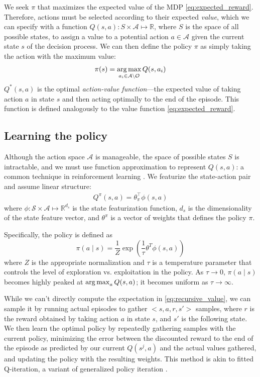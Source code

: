 We seek $\pi$ that maximizes the expected value of the MDP \eqref{eq:expected_reward}.
Therefore, actions must be selected according to their expected \emph{value}, which we can specify with a function $Q(s,a): S \times \mathcal{A} \mapsto \mathbb{R}$, where $S$ is the space of all possible states, to assign a value to a potential action $a \in \mathcal{A}$ given the current state $s$ of the decision process.
We can then define the policy $\pi$ as simply taking the action with the maximum value:
\begin{align}
\pi(s) = \operatorname*{arg\,max}_{a_i \in \mathcal{A} \setminus \mathcal{O}} Q(s,a_i)
\end{align}
$Q^*(s,a)$ is the optimal \emph{action-value function}---the expected value of taking action $a$ in state $s$ and then acting optimally to the end of the episode.
This function is defined analogously to the value function \eqref{eq:expected_reward}.

\subsection{Learning the policy}
Although the action space $\mathcal{A}$ is manageable, the space of possible states $S$ is intractable, and we must use function approximation to represent $Q(s,a)$: a common technique in reinforcement learning \cite{Sutton1998}.
We featurize the state-action pair and assume linear structure:
\begin{align}
Q^\pi(s,a) = \theta_\pi^\top \phi(s,a)
\end{align}
where $\phi: \mathcal{S} \times \mathcal{A} \mapsto \mathbb{R}^{d_s}$ is the state featurization function, $d_s$ is the dimensionality of the state feature vector, and $\theta^\pi$ is a vector of weights that defines the policy $\pi$.

Specifically, the policy is defined as
\begin{equation}
\pi(a \mid s) = \frac{1}{Z} \exp\left(\frac{1}{\tau} \theta^T \phi(s, a)\right)
\end{equation}
where $Z$ is the appropriate normalization and $\tau$ is a temperature parameter that controls the level of exploration vs. exploitation in the policy.
As $\tau \rightarrow 0$, ${\pi(a \mid s)}$ becomes highly peaked at $\operatorname*{arg\,max}_a Q(s,a)$; it becomes uniform as $\tau \rightarrow \infty$.

While we can't directly compute the expectation in \eqref{eq:recursive_value}, we can sample it by running actual episodes to gather $<s,a,r,s'>$ samples, where $r$ is the reward obtained by taking action $a$ in state $s$, and $s'$ is the following state.
We then learn the optimal policy by repeatedly gathering samples with the current policy, minimizing the error between the discounted reward to the end of the episode as predicted by our current $Q(s^j,a)$ and the actual values gathered, and updating the policy with the resulting weights.
This method is akin to fitted Q-iteration, a variant of generalized policy iteration \cite{Ernst2005,Sutton1998}.

